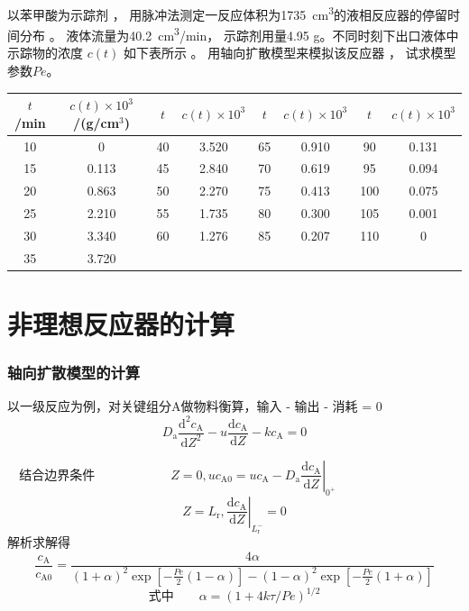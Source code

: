 \documentclass[dvipsnames, svgnames, x11names]{beamer}
\begin{document}
\begin{frame}[t]
    \frametitle{}
    \begin{example}
        以苯甲酸为示踪剂 ， 用脉冲法测定一反应体积为\SI{1735}{cm^3}的液相反应器的停留时间分布 。 液体流量为\SI{40.2}{cm^3/min}， 示踪剂用量4.95 g。不同时刻下出口液体中示踪物的浓度 $c(t)$ 如下表所示 。 用轴向扩散模型来模拟该反应器 ， 试求模型参数$Pe$。
        \begin{table}
            \centering
            \begin{tabular}{cc|cc|cc|cc}
                \bottomrule
                $t$/min & $c(t)\times 10^3$/(g/cm$^3$) & $t$ & $c(t)\times 10^3$ & $t$ & $c(t)\times 10^3$ & $t$ & $c(t)\times 10^3$   \\ \hline
                10 & 0     & 40 & 3.520 & 65 & 0.910 & 90 & 0.131  \\ 
                15 & 0.113 & 45 & 2.840 & 70 & 0.619 & 95 & 0.094  \\ 
                20 & 0.863 & 50 & 2.270 & 75 & 0.413 & 100 & 0.075  \\ 
                25 & 2.210 & 55 & 1.735 & 80 & 0.300 & 105 & 0.001  \\ 
                30 & 3.340 & 60 & 1.276 & 85 & 0.207 & 110 & 0  \\ 
                35 & 3.720 &  &  &  &  &  &  \\ \toprule
            \end{tabular}
        \end{table}
        \vspace{-5pt}
    \end{example}
\end{frame}


\section{非理想反应器的计算}


\begin{frame}
    \frametitle{轴向扩散模型的计算}

    以一级反应为例，对关键组分A做物料衡算，输入 - 输出 - 消耗 = 0
    \[
        D_{\mathrm{a}} \frac{\mathrm{d}^{2} c_{\mathrm{A}}}{\mathrm{d} Z^{2}}-u \frac{\mathrm{d} c_{\mathrm{A}}}{\mathrm{d} Z}-k c_{\mathrm{A}}=0
    \]
    
    \[
       \text{结合边界条件} \qquad \qquad \qquad  Z=0, u c_{\mathrm{A} 0}=u c_{\mathrm{A}}-\left.D_{\mathrm{a}} \frac{\mathrm{d} c_{\mathrm{A}}}{\mathrm{d} Z}\right|_{0^{+}} \qquad \qquad \qquad \qquad \quad
    \]
    \[
        Z=L_{\mathrm{r}},\left.\frac{\mathrm{d} c_{\mathrm{A}}}{\mathrm{d} Z}\right|_{L_{\mathrm{r}}^{-}}=0
    \]
    解析求解得
    \[
        \frac{c_{\mathrm{A}}}{c_{\mathrm{A} 0}}=\frac{4 \alpha}{(1+\alpha)^{2} \exp \left[-\frac{P e}{2}(1-\alpha)\right]-(1-\alpha)^{2} \exp \left[-\frac{P e}{2}(1+\alpha)\right]}
    \]
    \[
        \text{式中} \qquad \alpha=(1+4 k \tau / P e)^{1 / 2}
    \]

\end{frame}
\end{document}

